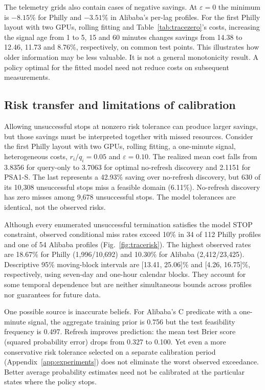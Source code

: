 \documentclass[conference]{IEEEtran}
\begin{document}
The telemetry grids also contain cases of negative savings. At $\varepsilon=0$ the minimum is $-8.15$\% for Philly and $-3.51$\% in Alibaba's per-lag profiles. For the first Philly layout with two GPUs, rolling fitting and Table~\ref{tab:tracezero}'s costs, increasing the signal age from 1 to 5, 15 and 60 minutes changes savings from 14.38 to 12.46, 11.73 and 8.76\%, respectively, on common test points. This illustrates how older information may be less valuable. It is not a general monotonicity result. A policy optimal for the fitted model need not reduce costs on subsequent measurements.

\subsection{Risk transfer and limitations of calibration}
\label{sec:risktransfer}
Allowing unsuccessful stops at nonzero risk tolerance can produce larger savings, but those savings must be interpreted together with missed resources. Consider the first Philly layout with two GPUs, rolling fitting, a one-minute signal, heterogeneous costs, $r_i/q_i=0.05$ and $\varepsilon=0.10$. The realized mean cost falls from 3.8356 for query-only to 3.7063 for optimal no-refresh discovery and 2.1151 for PSA1-S. The last represents a 42.93\% saving over no-refresh discovery, but 630 of its 10,308 unsuccessful stops miss a feasible domain (6.11\%). No-refresh discovery has zero misses among 9,678 unsuccessful stops. The model tolerances are identical, not the observed risks.

Although every enumerated unsuccessful termination satisfies the model STOP constraint, observed conditional miss rates exceed 10\% in 34 of 112 Philly profiles and one of 54 Alibaba profiles (Fig.~\ref{fig:tracerisk}). The highest observed rates are 18.67\% for Philly (1,996/10,692) and 10.30\% for Alibaba (2,412/23,425). Descriptive 95\% moving-block intervals are [13.41, 25.06]\% and [4.26, 16.75]\%, respectively, using seven-day and one-hour calendar blocks. They account for some temporal dependence but are neither simultaneous bounds across profiles nor guarantees for future data.

One possible source is inaccurate beliefs. For Alibaba's C predicate with a one-minute signal, the aggregate training prior is 0.756 but the test feasibility frequency is 0.497. Refresh improves prediction: the mean test Brier score (squared probability error) drops from 0.327 to 0.100. Yet even a more conservative risk tolerance selected on a separate calibration period (Appendix~\ref{app:experiments}) does not eliminate the worst observed exceedance. Better average probability estimates need not be calibrated at the particular states where the policy stops.
\end{document}
